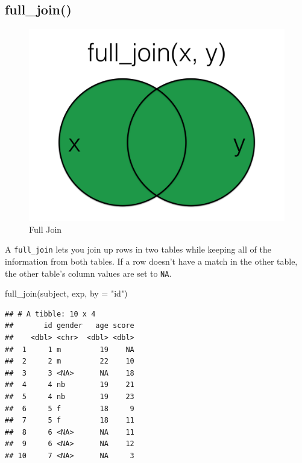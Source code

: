 \documentclass[
  oneside]{book}
\newenvironment{Shaded}{\begin{snugshade}}{\end{snugshade}}
\newcommand{\AttributeTok}[1]{\textcolor[rgb]{0.77,0.63,0.00}{#1}}
\newcommand{\FunctionTok}[1]{\textcolor[rgb]{0.00,0.00,0.00}{#1}}
\newcommand{\NormalTok}[1]{#1}
\newcommand{\StringTok}[1]{\textcolor[rgb]{0.31,0.60,0.02}{#1}}
\begin{document}
\hypertarget{full_join}{%
\subsection{full\_join()}\label{full_join}}

\begin{figure}

{\centering \includegraphics[width=1\linewidth]{images/joins/full_join} 

}

\caption{Full Join}\label{fig:img-full-join}
\end{figure}

A \texttt{full\_join} lets you join up rows in two tables while keeping all of the information from both tables. If a row doesn't have a match in the other table, the other table's column values are set to \texttt{NA}.

\begin{Shaded}
\begin{Highlighting}[]
\FunctionTok{full\_join}\NormalTok{(subject, exp, }\AttributeTok{by =} \StringTok{"id"}\NormalTok{)}
\end{Highlighting}
\end{Shaded}

\begin{verbatim}
## # A tibble: 10 x 4
##       id gender   age score
##    <dbl> <chr>  <dbl> <dbl>
##  1     1 m         19    NA
##  2     2 m         22    10
##  3     3 <NA>      NA    18
##  4     4 nb        19    21
##  5     4 nb        19    23
##  6     5 f         18     9
##  7     5 f         18    11
##  8     6 <NA>      NA    11
##  9     6 <NA>      NA    12
## 10     7 <NA>      NA     3
\end{verbatim}
\end{document}
